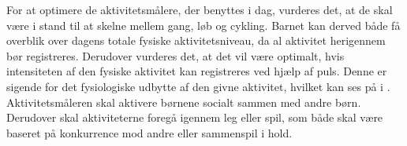 For at optimere de aktivitetsmålere, der benyttes i dag, vurderes det, at de skal være i stand til at skelne mellem gang, løb og cykling. Barnet kan derved både få overblik over dagens totale fysiske aktivitetsniveau, da al aktivitet herigennem bør registreres. %
Derudover vurderes det, at det vil være optimalt, hvis intensiteten af den fysiske aktivitet kan registreres ved hjælp af puls. Denne er sigende for det fysiologiske udbytte af den givne aktivitet, hvilket kan ses på  i .\newline
Aktivitetsmåleren skal aktivere børnene socialt sammen med andre børn. Derudover skal aktiviteterne foregå igennem leg eller spil, som både skal være baseret på konkurrence mod andre eller sammenspil i hold.